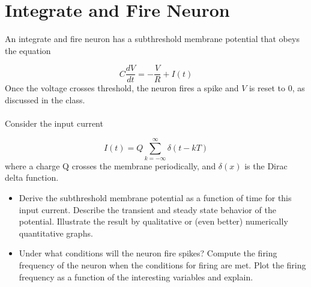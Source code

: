 \documentclass{article}
\begin{document}
\section*{Integrate and Fire Neuron}

An integrate and fire neuron has a subthreshold membrane potential that
obeys the equation

\bigskip
\begin{equation}
C\frac{dV}{dt}=-\frac{V}{R}+I(t)  \label{eqn:IF}
\end{equation}
Once the voltage crosses threshold, the neuron fires a spike and $V$ is
reset to $0 $, as discussed in the class.
\\
\\
Consider the input current

\begin{equation}
I(t)=Q\sum_{k=-\infty }^{\infty }\delta (t-kT)
\end{equation}
where a charge Q crosses the membrane periodically, and $\delta (x)$ is the Dirac delta function.

\begin{itemize}
\item  Derive the subthreshold membrane potential as a function of time
for this input current. Describe the transient and steady state
behavior of the potential. Illustrate the result by qualitative or
(even better) numerically quantitative graphs.

\item Under what conditions will the neuron fire spikes? Compute the
firing frequency of the neuron when the conditions for firing are
met. Plot the firing frequency as a function of the interesting
variables and explain.\newline
\end{itemize}
\end{document}
